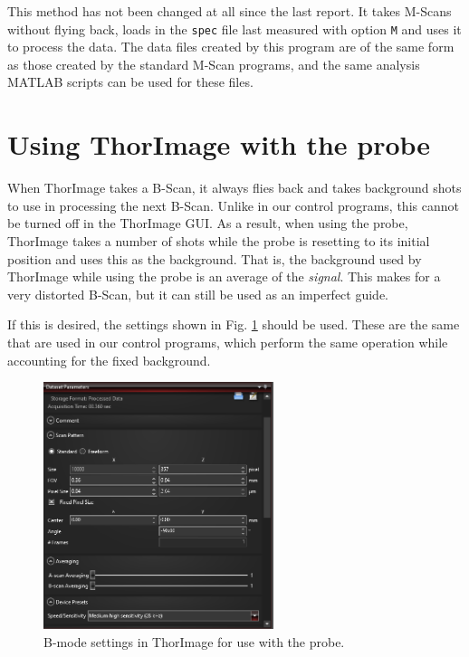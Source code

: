 \documentclass{article}
\begin{document}
\par{This method has not been changed at all since the last report. It takes M-Scans without flying back, loads in the \texttt{spec} file last measured with option \texttt{M} and uses it to process the data. The data files created by this program are of the same form as those created by the standard M-Scan programs, and the same analysis MATLAB scripts can be used for these files.}

\section{Using ThorImage with the probe}\label{thorimagesection}
\hypertarget{thorimagesection}{}

\par{When ThorImage takes a B-Scan, it always flies back and takes background shots to use in processing the next B-Scan. Unlike in our control programs, this cannot be turned off in the ThorImage GUI. As a result, when using the probe, ThorImage takes a number of shots while the probe is resetting to its initial position and uses this as the background. That is, the background used by ThorImage while using the probe is an average of the \textit{signal}. This makes for a very distorted B-Scan, but it can still be used as an imperfect guide.}

\par{If this is desired, the settings shown in Fig. \ref{tisettings} should be used. These are the same that are used in our control programs, which perform the same operation while accounting for the fixed background.}


\begin{figure}[!h]\label{tisettings}
	\centering
	\includegraphics[width=0.6\textwidth]{Data for Probe Writeup/ThorImage settings for BScan.png}
	\caption{B-mode settings in ThorImage for use with the probe.}
\end{figure}
\end{document}
